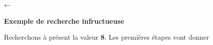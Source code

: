			\bigskip


			\textstyleWWPolicepardfaut{
			}\textstyleWWPolicepardfaut{
			}\textsf{←}\textstyleWWPolicepardfaut{ }

		{\sffamily\bfseries\upshape
		Exemple de recherche infructueuse}

			Recherchons à présent la valeur {\textbf{8}}. Les premières étapes vont donner
			
			
			\begin{center}
			\tablehead{}
			\begin{supertabular}
				{m{0.49700004cm}m{0.49700004cm}m{0.49700004cm}m{0.49700004cm}m{0.49700004cm}
				m{0.49700004cm}m{0.49700004cm}m{0.49700004cm}m{0.49700004cm}m{0.49700004cm}
				m{0.49700004cm}m{0.49700004cm}m{0.49700004cm}m{0.49700004cm}m{0.49700004cm}
				m{0.49700004cm}m{0.49700004cm}m{0.48300004cm}m{0.48300004cm}m{0.53000003cm}}
				

\end{supertabular}
\end{center}
